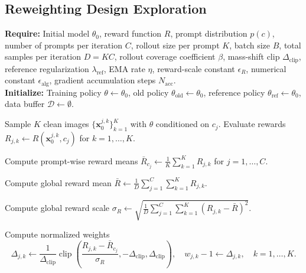 


\subsection{Reweighting Design Exploration}







\begin{algorithm}[H]
    \caption{Reinforced Flow Matching}
    \label{alg:velocity-add-delete}
    \textbf{Require:} Initial model $\theta_0$, reward function $R$, prompt distribution $p(c)$, number of prompts per iteration $C$, rollout size per prompt $K$, batch size $B$, total samples per iteration $D = KC$, rollout coverage coefficient $\beta$, mass-shift clip $\Delta_{\mathrm{clip}}$, reference regularization $\lambda_{\mathrm{ref}}$, EMA rate $\eta$, reward-scale constant $\epsilon_R$, numerical constant $\epsilon_{\mathrm{alg}}$, gradient accumulation steps $N_{\mathrm{acc}}$.\\
    \textbf{Initialize:} Training policy $\theta \leftarrow \theta_0$, old policy $\theta_{\mathrm{old}} \leftarrow \theta_0$, reference policy $\theta_{\mathrm{ref}} \leftarrow \theta_0$, data buffer $\mathcal{D} \leftarrow \emptyset$.
    \begin{algorithmic}[1]
             
                \State Sample $K$ clean images $\{\mathbf{x}_0^{j,k}\}_{k=1}^{K}$ with $\theta$ conditioned on $c_j$.
                \State Evaluate rewards $R_{j,k} \leftarrow R(\mathbf{x}_0^{j,k}, c_j)$ for $k = 1, \dots, K$.
            \EndFor

            \State Compute prompt-wise reward means
            $\bar{R}_{c_j} \leftarrow \frac{1}{K}\sum_{k=1}^{K} R_{j,k}$ for $j = 1, \dots, C$.

            \State Compute global reward mean
            $\bar{R} \leftarrow \frac{1}{D}\sum_{j=1}^{C}\sum_{k=1}^{K} R_{j,k}$.

            \State Compute global reward scale
            $\sigma_R \leftarrow \sqrt{\frac{1}{D}\sum_{j=1}^{C}\sum_{k=1}^{K}(R_{j,k} - \bar{R})^2}.$

                \State Compute normalized weights
                \[
                    \Delta_{j,k} \leftarrow \frac{1}{\Delta_{\mathrm{clip}}}
                    \operatorname{clip}\!\left(
                        \frac{R_{j,k} - \bar{R}_{c_j}}{\sigma_R},
                        -\Delta_{\mathrm{clip}},
                        \Delta_{\mathrm{clip}}
                    \right),
                    \quad
                    w_{j,k}-1\leftarrow \Delta_{j,k},
                    \quad k = 1, \dots, K.
                \]


\end{algorithmic}
\end{algorithm}
